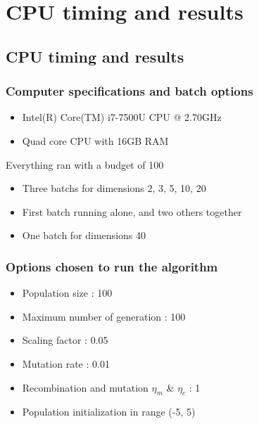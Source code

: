 \documentclass{beamer}
\begin{document}
\section{CPU timing and results}
\subsection{CPU timing and results}
\begin{frame}
  \frametitle{Computer specifications and batch options}
  \begin{itemize}
  \item Intel(R) Core(TM) i7-7500U CPU @ 2.70GHz
  \item Quad core CPU with 16GB RAM
  \end{itemize}
  \vspace{1em}
  Everything ran with a budget of 100\\
  \begin{itemize}
  \item Three batchs for dimensions 2, 3, 5, 10, 20
  \item First batch running alone, and two others together
  \item One batch for dimensions 40
  \end{itemize}
\end{frame}

\begin{frame}
  \frametitle{Options chosen to run the algorithm}
  \begin{itemize}
  \item Population size : 100
  \item Maximum number of generation : 100
  \item Scaling factor : 0.05
  \item Mutation rate : 0.01
  \item Recombination and mutation $\eta_m$ \& $\eta_c$ : 1
  \item Population initialization in range (-5, 5)
  \end{itemize}
\end{frame}
\end{document}
